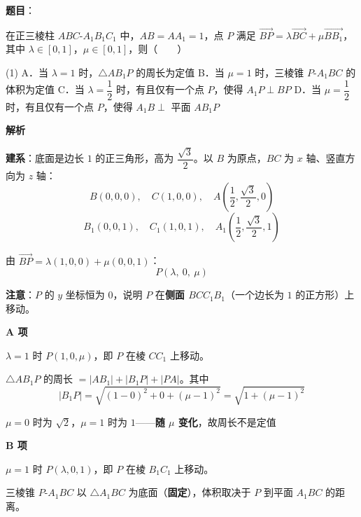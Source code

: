 \begin{answer}

\textbf{题目}：

在正三棱柱 $ABC\text{-}A_1B_1C_1$ 中，$AB=AA_1=1$，点 $P$ 满足 $\overrightarrow{BP}=\lambda\overrightarrow{BC}+\mu\overrightarrow{BB_1}$，其中 $\lambda\in[0,1]$，$\mu\in[0,1]$，则\mbox{（　　）}

\begin{gkopts}(1)
\task A．当 $\lambda=1$ 时，$\triangle AB_1P$ 的周长为定值
\task B．当 $\mu=1$ 时，三棱锥 $P\text{-}A_1BC$ 的体积为定值
\task C．当 $\lambda=\dfrac12$ 时，有且仅有一个点 $P$，使得 $A_1P\perp BP$
\task D．当 $\mu=\dfrac12$ 时，有且仅有一个点 $P$，使得 $A_1B\perp$ 平面 $AB_1P$
\end{gkopts}

\textbf{解析}

\textbf{建系}：底面是边长 $1$ 的正三角形，高为 $\dfrac{\sqrt3}2$。以 $B$ 为原点，$BC$ 为 $x$ 轴、竖直方向为 $z$ 轴：
\nopagebreak[4]
\[B(0,0,0),\quad C(1,0,0),\quad A\left(\frac12,\frac{\sqrt3}2,0\right)\]
\nopagebreak[4]
\[B_1(0,0,1),\quad C_1(1,0,1),\quad A_1\left(\frac12,\frac{\sqrt3}2,1\right)\]

由 $\overrightarrow{BP}=\lambda(1,0,0)+\mu(0,0,1)$：
\nopagebreak[4]
\[P(\lambda,\ 0,\ \mu)\]

\textbf{注意}：$P$ 的 $y$ 坐标恒为 $0$，说明 $P$ 在\textbf{侧面 $BCC_1B_1$}（一个边长为 $1$ 的正方形）上移动。

\par\medskip

\textbf{A 项 }

$\lambda=1$ 时 $P(1,0,\mu)$，即 $P$ 在棱 $CC_1$ 上移动。

$\triangle AB_1P$ 的周长 $=\left|AB_1\right|+\left|B_1P\right|+|PA|$。其中
\nopagebreak[4]
\[\left|B_1P\right|=\sqrt{(1-0)^{2}+0+(\mu-1)^{2}}=\sqrt{1+(\mu-1)^{2}}\]

$\mu=0$ 时为 $\sqrt2$，$\mu=1$ 时为 $1$——\textbf{随 $\mu$ 变化}，故周长不是定值 

\par\medskip

\textbf{B 项 }

$\mu=1$ 时 $P(\lambda,0,1)$，即 $P$ 在棱 $B_1C_1$ 上移动。

三棱锥 $P\text{-}A_1BC$ 以 $\triangle A_1BC$ 为底面（\textbf{固定}），体积取决于 $P$ 到平面 $A_1BC$ 的距离。


\end{answer}
